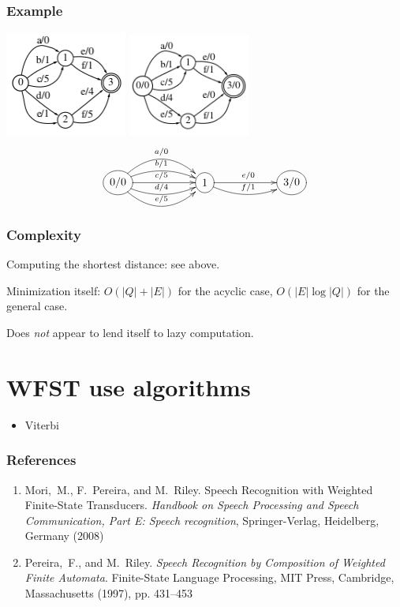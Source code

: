 \documentclass{beamer}
\newcommand{\<}{\langle}
\renewcommand{\>}{\rangle}
\begin{document}
\begin{frame}
  \frametitle{Example}
  \includegraphics[width=4cm]{minimization-example-1.png}
  \includegraphics[width=4cm]{minimization-example-2.png}
$$
\begin{xy}
  \entrymodifiers={++[o][F-]}
  \xymatrix@C=2cm{
    {0/0} \ar@/^5ex/[r]^{a/0} \ar@/^2.5ex/[r]^{b/1} \ar[r]^{c/5} \ar@/_2.5ex/[r]^{d/4} \ar@/_5ex/[r]^{e/5} & 
    {1} \ar[r]^{e/0} \ar@/_2.5ex/[r]^{f/1} & 
    {3/0}
  }
\end{xy}
$$
\end{frame}

\begin{frame}
  \frametitle{Complexity}
  
  Computing the shortest distance: see above.

  Minimization itself: $O(|Q| + |E|)$ for the acyclic case,
  $O(|E|\log|Q|)$ for the general case.

  Does {\em not} appear to lend itself to lazy computation.
\end{frame}

\section{WFST use algorithms}

\begin{frame}
  \begin{itemize}
  \item Viterbi
  \end{itemize}
\end{frame}

\begin{frame}
  \frametitle{References}
  \begin{enumerate}
  \item Mori,~M., F.~Pereira, and M.~Riley. Speech Recognition with
    Weighted Finite-State Transducers. \textit{Handbook on Speech
      Processing and Speech Communication, Part E: Speech
      recognition}, 
    Springer-Verlag, Heidelberg, Germany (2008)
  \item Pereira,~F., and M.~Riley. \textit{ Speech Recognition by
      Composition of Weighted Finite Automata}. Finite-State
    Language Processing, MIT Press, Cambridge, Massachusetts (1997),
    pp. 431--453  
  \end{enumerate}
\end{frame}
\end{document}
